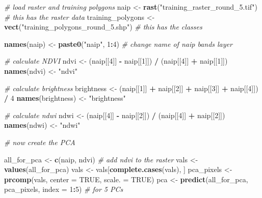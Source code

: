 \documentclass[
]{article}
\newenvironment{Shaded}{\begin{snugshade}}{\end{snugshade}}
\newcommand{\AttributeTok}[1]{\textcolor[rgb]{0.13,0.29,0.53}{#1}}
\newcommand{\CommentTok}[1]{\textcolor[rgb]{0.56,0.35,0.01}{\textit{#1}}}
\newcommand{\ConstantTok}[1]{\textcolor[rgb]{0.56,0.35,0.01}{#1}}
\newcommand{\DecValTok}[1]{\textcolor[rgb]{0.00,0.00,0.81}{#1}}
\newcommand{\FunctionTok}[1]{\textcolor[rgb]{0.13,0.29,0.53}{\textbf{#1}}}
\newcommand{\NormalTok}[1]{#1}
\newcommand{\OtherTok}[1]{\textcolor[rgb]{0.56,0.35,0.01}{#1}}
\newcommand{\SpecialCharTok}[1]{\textcolor[rgb]{0.81,0.36,0.00}{\textbf{#1}}}
\newcommand{\StringTok}[1]{\textcolor[rgb]{0.31,0.60,0.02}{#1}}
\begin{document}
\begin{Shaded}
\begin{Highlighting}[]
\CommentTok{\# load raster and training polygons}
\NormalTok{naip }\OtherTok{\textless{}{-}} \FunctionTok{rast}\NormalTok{(}\StringTok{"training\_raster\_round\_5.tif"}\NormalTok{) }\CommentTok{\# this has the raster data    }
\NormalTok{training\_polygons }\OtherTok{\textless{}{-}} \FunctionTok{vect}\NormalTok{(}\StringTok{"training\_polygons\_round\_5.shp"}\NormalTok{) }\CommentTok{\# this has the classes}

\FunctionTok{names}\NormalTok{(naip) }\OtherTok{\textless{}{-}} \FunctionTok{paste0}\NormalTok{(}\StringTok{"naip"}\NormalTok{, }\DecValTok{1}\SpecialCharTok{:}\DecValTok{4}\NormalTok{) }\CommentTok{\# change name of naip bands layer}

\CommentTok{\# calculate NDVI}
\NormalTok{ndvi }\OtherTok{\textless{}{-}}\NormalTok{ (naip[[}\DecValTok{4}\NormalTok{]] }\SpecialCharTok{{-}}\NormalTok{ naip[[}\DecValTok{1}\NormalTok{]]) }\SpecialCharTok{/}\NormalTok{ (naip[[}\DecValTok{4}\NormalTok{]] }\SpecialCharTok{+}\NormalTok{ naip[[}\DecValTok{1}\NormalTok{]])}
\FunctionTok{names}\NormalTok{(ndvi) }\OtherTok{\textless{}{-}} \StringTok{"ndvi"}

\CommentTok{\# calculate brightness}
\NormalTok{brightness }\OtherTok{\textless{}{-}}\NormalTok{ (naip[[}\DecValTok{1}\NormalTok{]] }\SpecialCharTok{+}\NormalTok{ naip[[}\DecValTok{2}\NormalTok{]] }\SpecialCharTok{+}\NormalTok{ naip[[}\DecValTok{3}\NormalTok{]] }\SpecialCharTok{+}\NormalTok{ naip[[}\DecValTok{4}\NormalTok{]]) }\SpecialCharTok{/} \DecValTok{4}
\FunctionTok{names}\NormalTok{(brightness) }\OtherTok{\textless{}{-}} \StringTok{"brightness"}

\CommentTok{\# calculate ndwi}
\NormalTok{ndwi }\OtherTok{\textless{}{-}}\NormalTok{ (naip[[}\DecValTok{4}\NormalTok{]] }\SpecialCharTok{{-}}\NormalTok{ naip[[}\DecValTok{2}\NormalTok{]]) }\SpecialCharTok{/}\NormalTok{ (naip[[}\DecValTok{4}\NormalTok{]] }\SpecialCharTok{+}\NormalTok{ naip[[}\DecValTok{2}\NormalTok{]])}
\FunctionTok{names}\NormalTok{(ndwi) }\OtherTok{\textless{}{-}} \StringTok{"ndwi"}

\CommentTok{\# now create the PCA }

\NormalTok{all\_for\_pca }\OtherTok{\textless{}{-}} \FunctionTok{c}\NormalTok{(naip, ndvi)  }\CommentTok{\# add ndvi to the raster}
\NormalTok{vals }\OtherTok{\textless{}{-}} \FunctionTok{values}\NormalTok{(all\_for\_pca)}
\NormalTok{vals }\OtherTok{\textless{}{-}}\NormalTok{ vals[}\FunctionTok{complete.cases}\NormalTok{(vals), ]}
\NormalTok{pca\_pixels }\OtherTok{\textless{}{-}} \FunctionTok{prcomp}\NormalTok{(vals, }\AttributeTok{center =} \ConstantTok{TRUE}\NormalTok{, }\AttributeTok{scale. =} \ConstantTok{TRUE}\NormalTok{)}
\NormalTok{pca }\OtherTok{\textless{}{-}} \FunctionTok{predict}\NormalTok{(all\_for\_pca, pca\_pixels, }\AttributeTok{index =} \DecValTok{1}\SpecialCharTok{:}\DecValTok{5}\NormalTok{)  }\CommentTok{\# for 5 PCs}
\end{Highlighting}
\end{Shaded}
\end{document}

